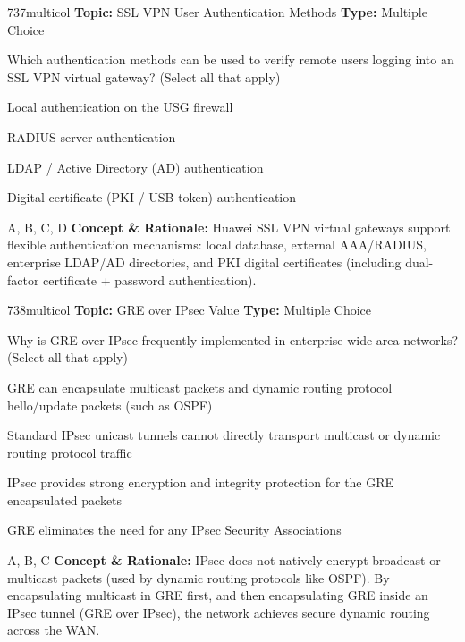 \begin{qcard}{737}{multicol}
\textcolor{darkslate!75}{\small\textbf{Topic:} SSL VPN User Authentication Methods \hfill \textbf{Type:} Multiple Choice}\vspace{0.4em}\par
Which authentication methods can be used to verify remote users logging into an SSL VPN virtual gateway? (Select all that apply)
\begin{qoptions}
\item Local authentication on the USG firewall
\item RADIUS server authentication
\item LDAP / Active Directory (AD) authentication
\item Digital certificate (PKI / USB token) authentication
\end{qoptions}
\end{qcard}
\nopagebreak
\begin{explainbox}{A, B, C, D}
\textbf{Concept \& Rationale:} Huawei SSL VPN virtual gateways support flexible authentication mechanisms: local database, external AAA/RADIUS, enterprise LDAP/AD directories, and PKI digital certificates (including dual-factor certificate + password authentication).
\end{explainbox}

\begin{qcard}{738}{multicol}
\textcolor{darkslate!75}{\small\textbf{Topic:} GRE over IPsec Value \hfill \textbf{Type:} Multiple Choice}\vspace{0.4em}\par
Why is GRE over IPsec frequently implemented in enterprise wide-area networks? (Select all that apply)
\begin{qoptions}
\item GRE can encapsulate multicast packets and dynamic routing protocol hello/update packets (such as OSPF)
\item Standard IPsec unicast tunnels cannot directly transport multicast or dynamic routing protocol traffic
\item IPsec provides strong encryption and integrity protection for the GRE encapsulated packets
\item GRE eliminates the need for any IPsec Security Associations
\end{qoptions}
\end{qcard}
\nopagebreak
\begin{explainbox}{A, B, C}
\textbf{Concept \& Rationale:} IPsec does not natively encrypt broadcast or multicast packets (used by dynamic routing protocols like OSPF). By encapsulating multicast in GRE first, and then encapsulating GRE inside an IPsec tunnel (GRE over IPsec), the network achieves secure dynamic routing across the WAN.
\end{explainbox}

